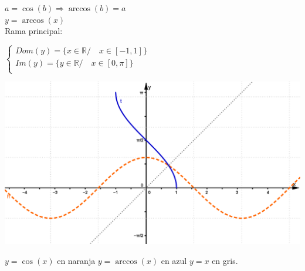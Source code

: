 \documentclass[a4paper,11pt,spanish,sans]{exam}
\begin{document}
\begin{minipage}{0.5\textwidth}
\centering
$a=\cos (b) \Rightarrow \arccos(b)=a $\\
$y=\arccos(x)$\\

Rama principal:

$\begin{cases}
Dom(y)=\lbrace x \in \mathbb{R} / \quad x \in [-1,1] \rbrace \\
Im(y)=\lbrace y \in \mathbb{R} / \quad x \in [0,\pi] \rbrace \\
\end{cases}
$
\end{minipage}
\begin{minipage}{0.5\textwidth}
	\includegraphics[width=\linewidth]{arccos.png}
	\begin{center}
		$y=\cos (x) $ en naranja $y=\arccos(x)$ en azul $y=x$ en gris.
	\end{center}
\end{minipage}
\end{document}
